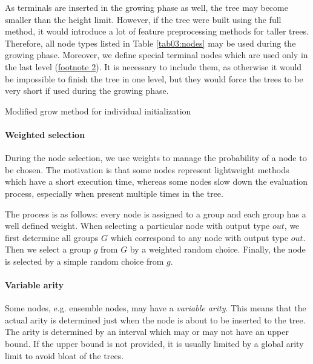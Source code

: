 As terminals are inserted in the growing phase as well, the tree may become
smaller than the height limit. However, if the tree were built using the full
method, it would introduce a lot of feature preprocessing methods for taller
trees. Therefore, all node types listed in Table \ref{tab03:nodes} may be used
during the growing phase. Moreover, we define special terminal nodes which are
used only in the last level (\hyperref[tab03:nodes]{footnote 2}). It is
necessary to include them, as otherwise it would be impossible to finish the
tree in one level, but they would force the trees to be very short if used
during the growing phase.

\begin{algorithm}
\DontPrintSemicolon 
\caption{Modified grow method for individual initialization\label{alg:ourgrow}}
  \;
  
\end{algorithm}

\paragraph{Weighted selection}
During the node selection, we use weights to manage the probability of a node
to be chosen. The motivation is that some nodes represent lightweight methods
which have a short execution time, whereas some nodes slow down the evaluation
process, especially when present multiple times in the tree.

The process is as follows: every node is assigned to a group and each group has
a well defined weight. When selecting a particular node with output type $out$, we 
first determine all groups $G$ which correspond to any node with output type
$out$. Then we select a group $g$ from $G$ by a weighted random choice.
Finally, the node is selected by a simple random choice from $g$.

\paragraph{Variable arity}
Some nodes, e.g. ensemble nodes, may have a \emph{variable arity}. This means
that the actual arity is determined just when the node is about to be inserted
to the tree. The arity is determined by an interval which may or may not have
an upper bound. If the upper bound is not provided, it is usually limited by
a global arity limit to avoid bloat of the trees.

